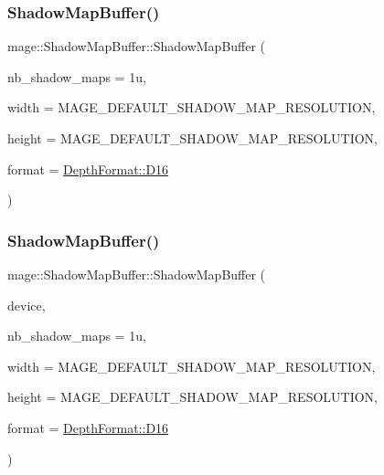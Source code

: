 \subsubsection{\texorpdfstring{Shadow\+Map\+Buffer()}{ShadowMapBuffer()}\hspace{0.1cm}{\footnotesize\ttfamily [1/4]}}
{\footnotesize\ttfamily mage\+::\+Shadow\+Map\+Buffer\+::\+Shadow\+Map\+Buffer (\begin{DoxyParamCaption}\item[{size\+\_\+t}]{nb\+\_\+shadow\+\_\+maps = {\ttfamily 1u},  }\item[{\hyperlink{namespacemage_a41c104c036fba3756a74e19f793eeaa1}{U32}}]{width = {\ttfamily MAGE\+\_\+DEFAULT\+\_\+SHADOW\+\_\+MAP\+\_\+RESOLUTION},  }\item[{\hyperlink{namespacemage_a41c104c036fba3756a74e19f793eeaa1}{U32}}]{height = {\ttfamily MAGE\+\_\+DEFAULT\+\_\+SHADOW\+\_\+MAP\+\_\+RESOLUTION},  }\item[{\hyperlink{namespacemage_a5446ec2e6bddf310216a1640c26576d3}{Depth\+Format}}]{format = {\ttfamily \hyperlink{namespacemage_a5446ec2e6bddf310216a1640c26576d3a6fd9ec81643ee5a57f85a71951bfe13d}{Depth\+Format\+::\+D16}} }\end{DoxyParamCaption})\hspace{0.3cm}{\ttfamily [explicit]}}

\hypertarget{structmage_1_1_shadow_map_buffer_a4c31a99a576d9dd799f21cfb3639f783}{}\label{structmage_1_1_shadow_map_buffer_a4c31a99a576d9dd799f21cfb3639f783} 
\subsubsection{\texorpdfstring{Shadow\+Map\+Buffer()}{ShadowMapBuffer()}\hspace{0.1cm}{\footnotesize\ttfamily [2/4]}}
{\footnotesize\ttfamily mage\+::\+Shadow\+Map\+Buffer\+::\+Shadow\+Map\+Buffer (\begin{DoxyParamCaption}\item[{I\+D3\+D11\+Device5 $\ast$}]{device,  }\item[{size\+\_\+t}]{nb\+\_\+shadow\+\_\+maps = {\ttfamily 1u},  }\item[{\hyperlink{namespacemage_a41c104c036fba3756a74e19f793eeaa1}{U32}}]{width = {\ttfamily MAGE\+\_\+DEFAULT\+\_\+SHADOW\+\_\+MAP\+\_\+RESOLUTION},  }\item[{\hyperlink{namespacemage_a41c104c036fba3756a74e19f793eeaa1}{U32}}]{height = {\ttfamily MAGE\+\_\+DEFAULT\+\_\+SHADOW\+\_\+MAP\+\_\+RESOLUTION},  }\item[{\hyperlink{namespacemage_a5446ec2e6bddf310216a1640c26576d3}{Depth\+Format}}]{format = {\ttfamily \hyperlink{namespacemage_a5446ec2e6bddf310216a1640c26576d3a6fd9ec81643ee5a57f85a71951bfe13d}{Depth\+Format\+::\+D16}} }\end{DoxyParamCaption})\hspace{0.3cm}{\ttfamily [explicit]}}

